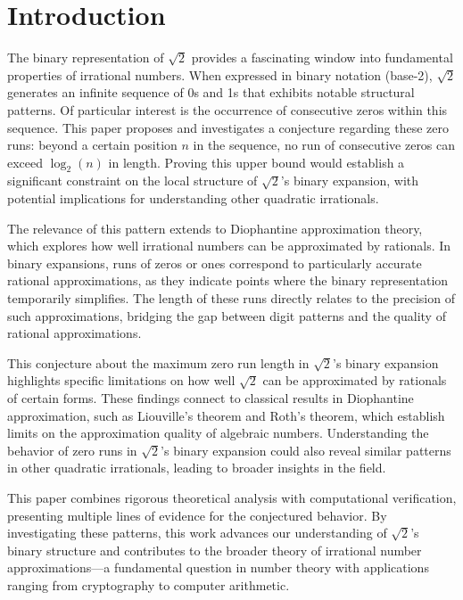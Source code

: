 \section{Introduction}
The binary representation of $\sqrt{2}$ provides a fascinating window into fundamental properties of irrational numbers. When expressed in binary notation (base-2), $\sqrt{2}$ generates an infinite sequence of 0s and 1s that exhibits notable structural patterns. Of particular interest is the occurrence of consecutive zeros within this sequence. This paper proposes and investigates a conjecture regarding these zero runs: beyond a certain position $n$ in the sequence, no run of consecutive zeros can exceed $\log_2(n)$ in length. Proving this upper bound would establish a significant constraint on the local structure of $\sqrt{2}$'s binary expansion, with potential implications for understanding other quadratic irrationals.

The relevance of this pattern extends to Diophantine approximation theory, which explores how well irrational numbers can be approximated by rationals. In binary expansions, runs of zeros or ones correspond to particularly accurate rational approximations, as they indicate points where the binary representation temporarily simplifies. The length of these runs directly relates to the precision of such approximations, bridging the gap between digit patterns and the quality of rational approximations.

This conjecture about the maximum zero run length in $\sqrt{2}$'s binary expansion highlights specific limitations on how well $\sqrt{2}$ can be approximated by rationals of certain forms. These findings connect to classical results in Diophantine approximation, such as Liouville’s theorem and Roth’s theorem, which establish limits on the approximation quality of algebraic numbers. Understanding the behavior of zero runs in $\sqrt{2}$'s binary expansion could also reveal similar patterns in other quadratic irrationals, leading to broader insights in the field.

This paper combines rigorous theoretical analysis with computational verification, presenting multiple lines of evidence for the conjectured behavior. By investigating these patterns, this work advances our understanding of $\sqrt{2}$'s binary structure and contributes to the broader theory of irrational number approximations—a fundamental question in number theory with applications ranging from cryptography to computer arithmetic.
